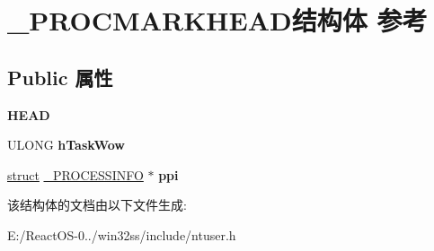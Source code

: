 \hypertarget{struct___p_r_o_c_m_a_r_k_h_e_a_d}{}\section{\+\_\+\+P\+R\+O\+C\+M\+A\+R\+K\+H\+E\+A\+D结构体 参考}
\label{struct___p_r_o_c_m_a_r_k_h_e_a_d}
\subsection*{Public 属性}
\begin{DoxyCompactItemize}
\item 
\mbox{\label{struct___p_r_o_c_m_a_r_k_h_e_a_d_abed9ab1cee3408ebbe99660ed4a15b48}} 
{\bfseries H\+E\+AD}
\item 
\mbox{\label{struct___p_r_o_c_m_a_r_k_h_e_a_d_a0a2c5d3b5198980e606a04f66bd89956}} 
U\+L\+O\+NG {\bfseries h\+Task\+Wow}
\item 
\mbox{\label{struct___p_r_o_c_m_a_r_k_h_e_a_d_a541558daae23b28f152f4f3ef50ef490}} 
\hyperlink{interfacestruct}{struct} \hyperlink{struct___p_r_o_c_e_s_s_i_n_f_o}{\+\_\+\+P\+R\+O\+C\+E\+S\+S\+I\+N\+FO} $\ast$ {\bfseries ppi}
\end{DoxyCompactItemize}


该结构体的文档由以下文件生成\+:\begin{DoxyCompactItemize}
\item 
E\+:/\+React\+O\+S-\/0../win32ss/include/ntuser.\+h\end{DoxyCompactItemize}
